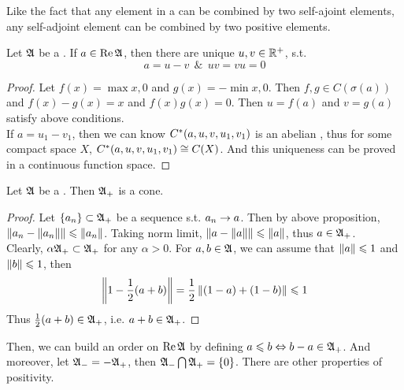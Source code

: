 \documentclass[a4paper,11pt]{report}
\begin{document}
Like the fact that any element in a \Cs can be combined by two self-ajoint elements, any self-adjoint element can be combined by two positive elements.

\begin{prop}
	Let $\mathfrak{A}$ be a \Cs. If $a \in \operatorname{Re}{\mathfrak{A}}$, then there are unique $u,v \in \mathbb{R}^{+}$, s.t.
	\begin{equation*}
		a = u - v ~~\&~~ uv = vu = 0
	\end{equation*}
\end{prop}
\begin{proof}
	Let $f(x) = \max{x,0}$ and $g(x) = - \min{x,0}$. Then $f,g \in C(\sigma(a))$ and $f(x)-g(x)=x$ and $f(x)g(x)=0$. Then $u = f(a)$ and $v = g(a)$ satisfy above conditions.\\
	If $a=u_1-v_1$, then we can know $C^{*}(a,u,v,u_1,v_1)$ is an abelian \Cs, thus for some compact space $X$, $C^{*}(a,u,v,u_1,v_1) \cong C(X)$. And this uniqueness can be proved in a continuous function space.
\end{proof}

\begin{cor}
	Let $\mathfrak{A}$ be a \Cs. Then $\mathfrak{A}_{+}$ is a cone.
\end{cor}
\begin{proof}
	Let $\{a_n\} \subset \mathfrak{A}_{+}$ be a sequence s.t. $a_n \rightarrow a$. Then by above proposition, $\left\lVert a_n-\left\lVert a_n\right\lVert\right\lVert \leqslant \left\lVert a_n\right\lVert$. Taking norm limit, 
	$\left\lVert a-\left\lVert a\right\lVert\right\lVert \leqslant \left\lVert a\right\lVert$, thus $a \in \mathfrak{A}_{+}$.\\
	Clearly, $\alpha \mathfrak{A}_{+} \subset \mathfrak{A}_{+}$ for any $\alpha >0$. For $a, b \in \mathfrak{A}$, we can assume that $\left\lVert a\right\lVert \leqslant 1$ and $\left\lVert b\right\lVert \leqslant 1$, then
	\begin{equation*}
		\left\lVert1-\frac{1}{2}(a+b)\right\lVert = \frac{1}{2}\left\lVert(1-a)+(1-b)\right\lVert \leqslant 1
	\end{equation*}
	Thus $\frac{1}{2}(a+b) \in \mathfrak{A}_{+}$, i.e. $a+b \in \mathfrak{A}_{+}$.
\end{proof}

Then, we can build an order on $\operatorname{Re}{\mathfrak{A}}$ by defining $a \leqslant b \Leftrightarrow b-a \in \mathfrak{A}_{+}$. And moreover, let $\mathfrak{A}_{-} = - \mathfrak{A}_{+}$, then $\mathfrak{A}_{-} \bigcap \mathfrak{A}_{+} = \{0\}$. There are other properties of positivity.
\end{document}
